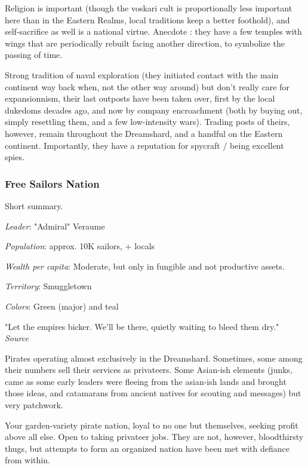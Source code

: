 Religion is important (though the voskari cult is proportionally less important here than in the Eastern Realms, local traditions keep a better foothold), and self-sacrifice as well is a national virtue. Anecdote : they have a few temples with wings that are periodically rebuilt facing another direction, to symbolize the passing of time.

Strong tradition of naval exploration (they initiated contact with the main continent way back when, not the other way around) but don't really care for expansionnism, their last outposts have been taken over, first by the local dukedoms decades ago, and now by company encroachment (both by buying out, simply resettling them, and a few low-intensity wars). Trading posts of theirs, however, remain throughout the Dreamshard, and a handful on the Eastern continent. Importantly, they have a reputation for spycraft / being excellent spies.


\subsubsection{Free Sailors Nation}

Short summary.

\textit{Leader}: "Admiral" Veraume

\textit{Population}: approx. 10K sailors, + locals

\textit{Wealth per capita}: Moderate, but only in fungible and not productive assets.

\textit{Territory}: Smuggletown
    
\textit{Colors}: Green (major) and teal

\begin{rpg-quotebox}
    "Let the empires bicker. We'll be there, quietly waiting to bleed them dry." \\ \textendash \textit{Source}
\end{rpg-quotebox}


Pirates operating almost exclusively in the Dreamshard. Sometimes, some among their numbers sell their services as privateers. Some Asian-ish elements (junks, came as some early leaders were fleeing from the asian-ish lands and brought those ideas, and catamarans from ancient natives for scouting and messages) but very patchwork. 

	
Your garden-variety pirate nation, loyal to no one but themselves, seeking profit above all else. Open to taking privateer jobs. They are not, however, bloodthirsty thugs, but attempts to form an organized nation have been met with defiance from within.






